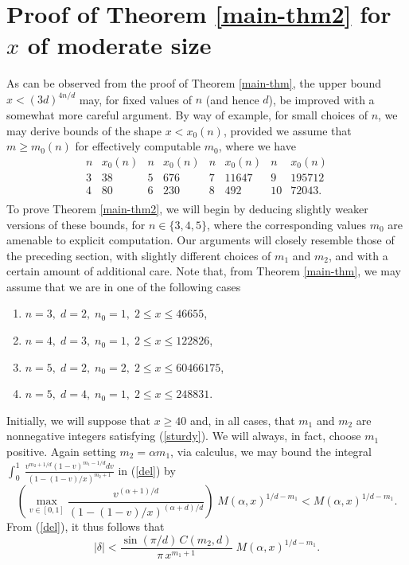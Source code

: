 \section{Proof of Theorem \ref{main-thm2} for $x$ of moderate size }  \label{sec-main-thm2}

As can be observed from the proof of Theorem \ref{main-thm}, the upper bound $x <  (3d)^{4n/d}$ may, for fixed values of $n$ (and hence $d$), be improved with a somewhat more careful argument. By way of example, for small choices of $n$, we may derive bounds of the shape $x < x_0(n)$, provided we assume that $m \geq m_0 (n)$ for effectively computable $m_0$, where we have
$$
\begin{array}{cc|cc|cc|cc} \hline
n & x_0(n) & n & x_0(n) & n & x_0(n) & n & x_0(n) \\ \hline
3 & 38 & 5 & 676 & 7 & 11647 & 9 & 195712 \\
4 & 80  & 6 & 230 & 8 & 492 & 10 &  72043. \\
\end{array}
$$
To prove Theorem \ref{main-thm2}, we will begin by deducing slightly weaker versions of these bounds, for $n \in \{ 3, 4, 5 \}$, where the corresponding values $m_0$ are amenable to explicit computation. Our arguments will closely resemble those of the preceding section, with slightly different choices of $m_1$ and $m_2$, and with a certain amount of additional care. Note that, from Theorem \ref{main-thm}, we may assume that we are in one of the following cases
\begin{enumerate}
\item $n=3, \; d=2, \;  n_0=1, \; 2 \leq x \leq 46655$,
\item $n=4, \; d=3, \; n_0=1, \; 2 \leq x \leq 122826$,
\item $n=5, \; d=2, \; n_0=2, \; 2 \leq x \leq 60466175$,
\item $n=5, \; d=4, \; n_0=1, \; 2 \leq x \leq 248831$.
\end{enumerate}
Initially, we will suppose that $x \geq 40$ and, in all cases, that $m_1$ and $m_2$ are nonnegative integers satisfying (\ref{sturdy}). We will always, in fact, choose $m_1$ positive. Again setting $m_2=\alpha m_1$, 
via calculus, we may bound the integral $\int^{1}_{0} ~
\frac{v^{m_2+1/d} (1-v)^{m_1-1/d} dv}{(1-(1-v)/x)^{m_2+1}}$ in (\ref{del}) by
$$
\left( \max_{v \in [0,1]} \frac{v^{(\alpha+1)/d}}{ \left( 1 - (1-v)/x \right)^{(\alpha+d)/d}} \right) 
\; M(\alpha,x)^{1/d-m_1} < M(\alpha,x)^{1/d-m_1}.
$$
From (\ref{del}), it thus follows that
\begin{equation} \label{del-upper}
|\delta| < \frac{\sin (\pi/d) \, C(m_2,d)}{\pi \,  x^{m_1+1}} \;  M(\alpha,x)^{1/d-m_1}.
\end{equation}


